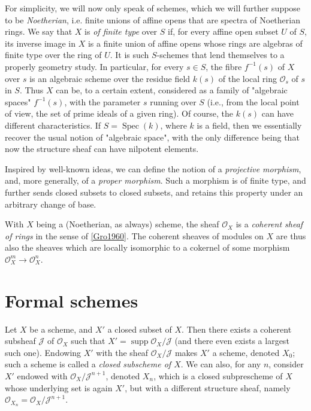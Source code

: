   For simplicity, we will now only speak of schemes, which we will further suppose to be \emph{Noetherian}, i.e. finite unions of affine opens that are spectra of Noetherian rings.
  We say that \(X\) is \emph{of finite type} over \(S\) if, for every affine open subset \(U\) of \(S\), its inverse image in \(X\) is a finite union of affine opens whose rings are algebras of finite type over the ring of \(U\).
  It is such \(S\)-schemes that lend themselves to a properly geometry study.
  In particular, for every \(s\in  S\), the fibre \(f^{-1}(s)\) of \(X\) over \(s\) is an algebraic scheme over the residue field \(k(s)\) of the local ring \(\mathcal {O}_s\) of \(s\) in \(S\).
  Thus \(X\) can be, to a certain extent, considered as a family of "algebraic spaces" \(f^{-1}(s)\), with the parameter \(s\) running over \(S\) (i.e., from the local point of view, the set of prime ideals of a given ring).
  Of course, the \(k(s)\) can have different characteristics.
  If \(S=\operatorname {Spec}(k)\), where \(k\) is a field, then we essentially recover the usual notion of "algebraic space", with the only difference being that now the structure sheaf can have nilpotent elements.\par{}Inspired by well-known ideas, we can define the notion of a \emph{projective morphism}, and, more generally, of a \emph{proper morphism}.
  Such a morphism is of finite type, and further sends closed subsets to closed subsets, and retains this property under an arbitrary change of base.\par{}With \(X\) being a (Noetherian, as always) scheme, the sheaf \(\mathcal {O}_X\) is a \emph{coherent sheaf of rings} in the sense of \hyperref[Gro1960]{[Gro1960]}.
  The coherent sheaves of modules on \(X\) are thus also the sheaves which are locally isomorphic to a cokernel of some morphism \(\mathcal {O}_X^m\to \mathcal {O}_X^n\).\chapter{Formal schemes}\thispagestyle{fancy}\label{fga2-2}\par{}Let \(X\) be a scheme, and \(X'\) a closed subset of \(X\).
  Then there exists a coherent subsheaf \(\mathscr {J}\) of \(\mathcal {O}_X\) such that \(X'=\operatorname {supp}\mathcal {O}_X/\mathscr {J}\) (and there even exists a largest such one).
  Endowing \(X'\) with the sheaf \(\mathcal {O}_X/\mathscr {J}\) makes \(X'\) a scheme, denoted \(X_0\);
  such a scheme is called a \emph{closed subscheme of \(X\)}.
  We can also, for any \(n\), consider \(X'\) endowed with \(\mathcal {O}_X/\mathscr {J}^{n+1}\), denoted \(X_n\), which is a closed subprescheme of \(X\) whose underlying set is again \(X'\), but with a different structure sheaf, namely \(\mathcal {O}_{X_n}=\mathcal {O}_X/\mathscr {J}^{n+1}\).
